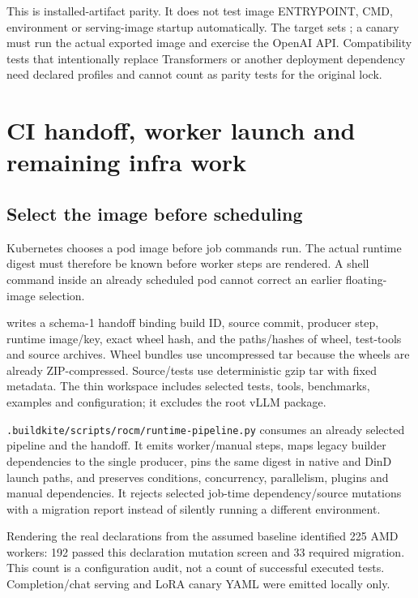 \documentclass[11pt,a4paper]{article}
\newcommand{\file}[1]{\nolinkurl{#1}}
\newcommand{\term}[1]{\texttt{\detokenize{#1}}}
\begin{document}
This is installed-artifact parity. It does not test image ENTRYPOINT, CMD,
environment or serving-image startup automatically. The \term{deployment} target
sets \term{vllm serve}; a canary must run the actual exported image and exercise
the OpenAI API. Compatibility tests that intentionally replace Transformers or
another deployment dependency need declared profiles and cannot count as parity
tests for the original lock.

\section{CI handoff, worker launch and remaining infra work}

\subsection{Select the image before scheduling}

Kubernetes chooses a pod image before job commands run. The actual runtime digest
must therefore be known before worker steps are rendered. A shell command inside
an already scheduled pod cannot correct an earlier floating-image selection.

\term{local_runtime.py pack} writes a schema-1 handoff binding build ID, source
commit, producer step, runtime image/key, exact wheel hash, and the paths/hashes of
wheel, test-tools and source archives. Wheel bundles use uncompressed tar because
the wheels are already ZIP-compressed. Source/tests use deterministic gzip tar
with fixed metadata. The thin workspace includes selected tests, tools,
benchmarks, examples and configuration; it excludes the root vLLM package.

\file{.buildkite/scripts/rocm/runtime-pipeline.py} consumes an already selected
pipeline and the handoff. It emits worker/manual steps, maps legacy builder
dependencies to the single producer, pins the same digest in native and DinD
launch paths, and preserves conditions, concurrency, parallelism, plugins and
manual dependencies. It rejects selected job-time dependency/source mutations
with a migration report instead of silently running a different environment.

Rendering the real declarations from the assumed baseline identified 225 AMD
workers: 192 passed this declaration mutation screen and 33 required migration.
This count is a configuration audit, not a count of successful executed tests.
Completion/chat serving and LoRA canary YAML were emitted locally only.
\end{document}
